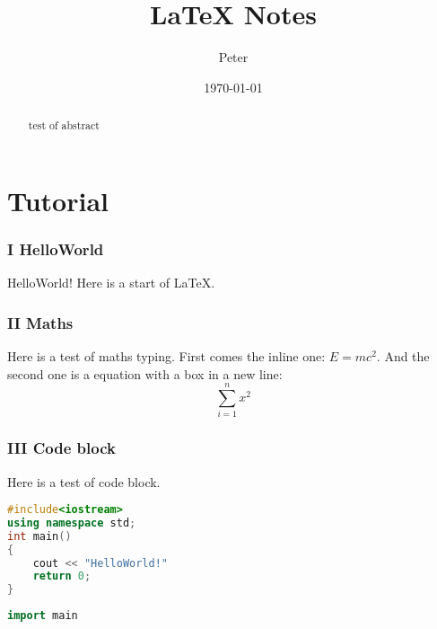 \documentclass{article}
\begin{document}
\title{LaTeX Notes}
\author{Peter}
\date{\today}
\maketitle

\begin{abstract}
test of abstract
\end{abstract}

\setcounter{tocdepth}{2}
\tableofcontents

\part{Tutorial}

\section{I HelloWorld}

HelloWorld! Here is a start of \LaTeX. 

\section{II Maths}

Here is a test of maths typing. First comes the inline one: $ E=mc^2 $. And the second one is a equation with a box in a new line:
$$\boxed{\sum\limits_{i=1}^{n}x^2}$$

\section{III Code block}

Here is a test of code block.

\begin{lstlisting}[language={C++}]
#include<iostream>
using namespace std;
int main()
{
    cout << "HelloWorld!"
    return 0;
}
\end{lstlisting}

\begin{lstlisting}[language={Go}]
import main

\end{lstlisting}
\end{document}
